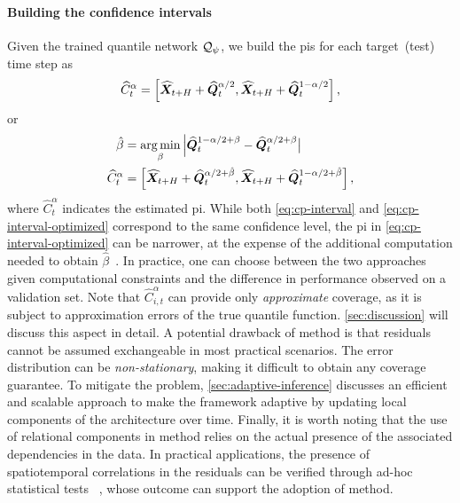 \paragraph{Building the confidence intervals} Given the trained quantile network ${\mathcal{Q}}_\psi$, we build the \glspl{pi} for each target~(test) time step as
\begin{equation}\label{eq:cp-interval}
    \widehat C^\alpha_{t} = \left[\widehat {{\bm{X}}}_{t+H} + \widehat{{\bm{Q}}}^{\alpha/2}_t, \widehat {{\bm{X}}}_{t+H} + \widehat{{\bm{Q}}}^{1-\alpha/2}_t\right],
\end{equation}
or
\begin{align}
    \hat \beta &= \operatorname*{arg\,min}_\beta \Big|\widehat{{\bm{Q}}}^{1-\alpha/2 + \beta}_t - \widehat{{\bm{Q}}}^{\alpha/2 + \beta}_t\big|\\
    \widehat C^\alpha_{t} &= \left[\widehat {{\bm{X}}}_{t+H} + \widehat{{\bm{Q}}}^{\alpha/2 + \hat \beta}_t, \widehat {{\bm{X}}}_{t+H} + \widehat{{\bm{Q}}}^{1-\alpha/2 + \hat \beta}_t\right],\label{eq:cp-interval-optimized}
\end{align}
where  $\widehat C^\alpha_{t}$ indicates the estimated \gls{pi}. While both \autoref{eq:cp-interval} and \autoref{eq:cp-interval-optimized} correspond to the same confidence level, the \gls{pi} in \autoref{eq:cp-interval-optimized} can be narrower, at the expense of the additional computation needed to obtain $\hat \beta$~\cite{xu2023conformal}. In practice, one can choose between the two approaches given computational constraints and the difference in performance observed on a validation set.  Note that $\widehat C^\alpha_{i,t}$ can provide only \textit{approximate} coverage, as it is subject to approximation errors of the true quantile function. \autoref{sec:discussion} will discuss this aspect in detail. 
{A potential drawback of \gls{method} is that residuals cannot be assumed exchangeable in most practical scenarios. The error distribution can be \textit{non-stationary}, making it difficult to obtain any coverage guarantee. To mitigate the problem, \autoref{sec:adaptive-inference} discusses an efficient and scalable approach to make the framework adaptive by updating local components of the architecture over time.} Finally, it is worth noting that the use of relational components in \gls{method} relies on the actual presence of the associated dependencies in the data. 
In practical applications, the presence of spatiotemporal correlations in the residuals can be verified through ad-hoc statistical tests ~\cite{zambon2022aztest, zambon2023where}, whose outcome can support the adoption of \gls{method}. 

